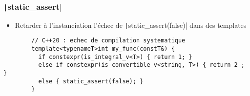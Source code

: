 \documentclass[C++.tex]{subfiles}
\begin{document}
\begin{frame}[fragile]
	\frametitle{\texttt|static_assert|}
	\begin{itemize}
		\item Retarder à l'instanciation l'échec de \texttt|static_assert(false)| dans des templates
	\end{itemize}

	\begin{verbatim}
		// C++20 : echec de compilation systematique
		template<typenameT>int my_func(constT&) {
		  if constexpr(is_integral_v<T>) { return 1; }
		  else if constexpr(is_convertible_v<string, T>) { return 2 ; }
		  else { static_assert(false); }
		}
	\end{verbatim}

\end{frame}
\end{document}
